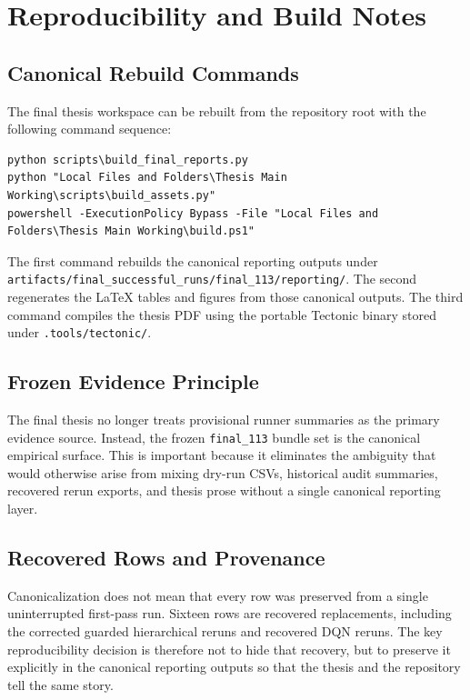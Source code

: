 \chapter{Reproducibility and Build Notes}

\section{Canonical Rebuild Commands}

The final thesis workspace can be rebuilt from the repository root with the following command sequence:
\begin{verbatim}
python scripts\build_final_reports.py
python "Local Files and Folders\Thesis Main Working\scripts\build_assets.py"
powershell -ExecutionPolicy Bypass -File "Local Files and Folders\Thesis Main Working\build.ps1"
\end{verbatim}

The first command rebuilds the canonical reporting outputs under \texttt{artifacts/final\_successful\_runs/final\_113/reporting/}. The second regenerates the LaTeX tables and figures from those canonical outputs. The third command compiles the thesis PDF using the portable Tectonic binary stored under \texttt{.tools/tectonic/}.

\section{Frozen Evidence Principle}

The final thesis no longer treats provisional runner summaries as the primary evidence source. Instead, the frozen \texttt{final\_113} bundle set is the canonical empirical surface. This is important because it eliminates the ambiguity that would otherwise arise from mixing dry-run CSVs, historical audit summaries, recovered rerun exports, and thesis prose without a single canonical reporting layer.

\section{Recovered Rows and Provenance}

Canonicalization does not mean that every row was preserved from a single uninterrupted first-pass run. Sixteen rows are recovered replacements, including the corrected guarded hierarchical reruns and recovered DQN reruns. The key reproducibility decision is therefore not to hide that recovery, but to preserve it explicitly in the canonical reporting outputs so that the thesis and the repository tell the same story.

